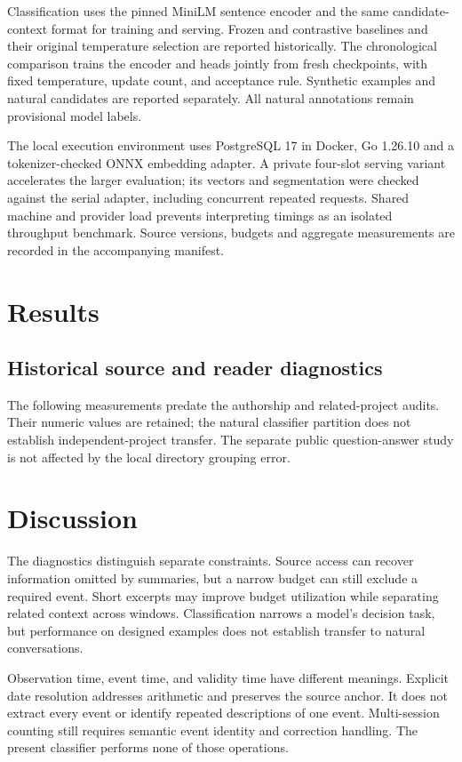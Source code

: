 \documentclass[11pt]{article}
\begin{document}
Classification uses the pinned MiniLM sentence encoder and the same candidate-context format for training and serving. Frozen and contrastive baselines and their original temperature selection are reported historically. The chronological comparison trains the encoder and heads jointly from fresh checkpoints, with fixed temperature, update count, and acceptance rule. Synthetic examples and natural candidates are reported separately. All natural annotations remain provisional model labels.

The local execution environment uses PostgreSQL 17 in Docker, Go 1.26.10 and a tokenizer-checked ONNX embedding adapter. A private four-slot serving variant accelerates the larger evaluation; its vectors and segmentation were checked against the serial adapter, including concurrent repeated requests. Shared machine and provider load prevents interpreting timings as an isolated throughput benchmark. Source versions, budgets and aggregate measurements are recorded in the accompanying manifest.

\section{Results}

\subsection{Historical source and reader diagnostics}
The following measurements predate the authorship and related-project audits. Their numeric values are retained; the natural classifier partition does not establish independent-project transfer. The separate public question-answer study is not affected by the local directory grouping error.




\section{Discussion}
The diagnostics distinguish separate constraints. Source access can recover information omitted by summaries, but a narrow budget can still exclude a required event. Short excerpts may improve budget utilization while separating related context across windows. Classification narrows a model's decision task, but performance on designed examples does not establish transfer to natural conversations.

Observation time, event time, and validity time have different meanings. Explicit date resolution addresses arithmetic and preserves the source anchor. It does not extract every event or identify repeated descriptions of one event. Multi-session counting still requires semantic event identity and correction handling. The present classifier performs none of those operations.
\end{document}
